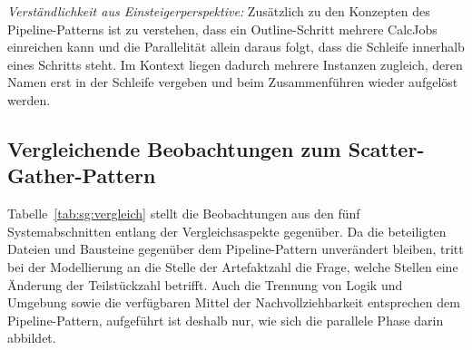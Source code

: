 \emph{Verständlichkeit aus Einsteigerperspektive:} Zusätzlich zu den
Konzepten des Pipeline-Patterns ist zu verstehen, dass ein
Outline-Schritt mehrere CalcJobs einreichen kann und die Parallelität
allein daraus folgt, dass die Schleife innerhalb eines Schritts
steht. Im Kontext liegen dadurch mehrere Instanzen zugleich, deren
Namen erst in der Schleife vergeben und beim Zusammenführen wieder
aufgelöst werden.

\subsection{Vergleichende Beobachtungen zum Scatter-Gather-Pattern}
\label{sec:lokal:sg:zusammenfassung}

Tabelle~\ref{tab:sg:vergleich} stellt die Beobachtungen aus den fünf
Systemabschnitten entlang der Vergleichsaspekte gegenüber. Da die
beteiligten Dateien und Bausteine gegenüber dem Pipeline-Pattern
unverändert bleiben, tritt bei der Modellierung an die Stelle der
Artefaktzahl die Frage, welche Stellen eine Änderung der
Teilstückzahl betrifft. Auch die Trennung von Logik und Umgebung
sowie die verfügbaren Mittel der Nachvollziehbarkeit entsprechen dem
Pipeline-Pattern, aufgeführt ist deshalb nur, wie sich die parallele
Phase darin abbildet.

